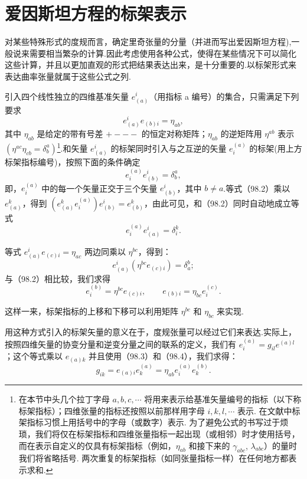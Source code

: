 \section{爱因斯坦方程的标架表示}

对某些特殊形式的度规而言，确定里奇张量的分量（并进而写出爱因斯坦方程),一般说来需要相当繁杂的计算.因此考虑使用各种公式，使得在某些情况下可以简化这些计算，并且以更加直观的形式把结果表达出来，是十分重要的.以标架形式来表达曲率张量就属于这些公式之列.

引入四个线性独立的四维基准矢量 $e^i_{(a)}$（用指标 a 编号）的集合，只需满足下列要求
\begin{equation}
  e^i_{(a)}e_{(b)i}=\eta_{ab},
\end{equation}
其中 $\eta_{ab}$ 是给定的带有号差 $+---$ 的恒定对称矩阵；$\eta_{ab}$ 的逆矩阵用 $\eta^{ab}$ 表示 $(\eta^{ac}\eta_{cb}=\delta^a_b)$\footnote{在本节中头几个拉丁字母 $a,b,c,\cdots$ 将用来表示给基准矢量编号的指标（以下称标架指标）；四维张量的指标还按照以前那样用字母 $i,k,l,\cdots$ 表示. 在文献中标架指标习惯上用括号中的字母（或数字）表示. 为了避免公式的书写过于烦琐，我们将仅在标架指标和四维张量指标一起出现（或相邻）时才使用括号，而在表示自定义的仅具有标架指标（例如，$\eta_{ab}$ 和接下来的 $\gamma_{abc}$, $\lambda_{abc}$）的量时我们将省略括号. 两次重复的标架指标（如同张量指标一样）在任何地方都表示求和.}.和矢量 $e^i_{(a)}$ 的标架同时引入与之互逆的矢量 $e^{(a)}_i$ 的标架(用上方标架指标编号)，按照下面的条件确定
\begin{equation}
  e^{(a)}_ie^i_{(b)}=\delta^a_b,
\end{equation}
即，$e^{(a)}_i$ 中的每一个矢量正交于三个矢量 $e^i_{(b)}$，其中 $b\neq a$.等式（98.2）乘以 $e^k_{(a)}$，得到 $\left(e^k_{(a)}e^{(a)}_i\right)e^i_{(b)}=e^k_{(b)}$，由此可见，和（98.2）同时自动地成立等式
\begin{equation}
  e^{(a)}_ie^i_{(a)}=\delta^k_i.
\end{equation}

等式 $e^i_{(a)}e_{(c)i}=\eta_{ac}$ 两边同乘以 $\eta^{bc}$，得到：
\begin{equation*}
  e^i_{(a)}\left(\eta^{bc}e_{(c)i}\right)=\delta^b_a;
\end{equation*}
与（98.2）相比较，我们求得
\begin{equation}
  e^{(b)}_i=\eta^{bc}e_{(c)i},\qquad
  e_{(b)i}=\eta_{bc}e^{(c)}_i.
\end{equation}

这样一来，标架指标的上移和下移可以利用矩阵 $\eta^{bc}$ 和 $\eta_{bc}$ 来实现.

用这种方式引入的标架矢量的意义在于，度规张量可以经过它们来表达.实际上，按照四维矢量的协变分量和逆变分量之间的联系的定义，我们有 $e^{(a)}_i=g_{il}e^{(a)l}$；这个等式乘以 $e_{(a)k}$ 并且使用（98.3）和（98.4），我们求得：
\begin{equation}
  g_{ik}=e_{(a)i}e^{(a)}_k=\eta_{ab}e^{(a)}_ie^{(b)}_k.
\end{equation}

